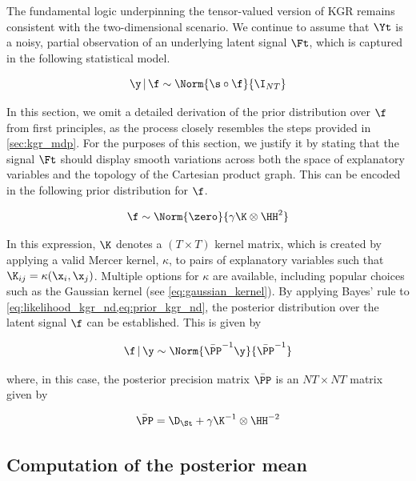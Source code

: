 The fundamental logic underpinning the tensor-valued version of KGR remains consistent with the two-dimensional scenario. We continue to assume that $\Yt$ is a noisy, partial observation of an underlying latent signal $\Ft$, which is captured in the following statistical model.

\begin{equation}
    \label{eq:likelihood_kgr_nd}
    \y \, | \, \f \sim \Norm{\s \circ \f}{\I_{NT}}
\end{equation}

In this section, we omit a detailed derivation of the prior distribution over $\f$ from first principles, as the process closely resembles the steps provided in \cref{sec:kgr_mdp}. For the purposes of this section, we justify it by stating that the signal $\Ft$ should display smooth variations across both the space of explanatory variables and the topology of the Cartesian product graph. This can be encoded in the following prior distribution for $\f$.

\begin{equation}
    \label{eq:prior_kgr_nd}
    \f \sim \Norm{\zero}{\gamma \K \otimes \HH^2}
\end{equation}

In this expression, $\K$ denotes a $(T \times T)$ kernel matrix, which is created by applying a valid Mercer kernel, $\kappa$, to pairs of explanatory variables such that $\K_{ij} = \kappa(\x_i, \x_j)$. Multiple options for $\kappa$ are available, including popular choices such as the Gaussian kernel (see \cref{eq:gaussian_kernel}). By applying Bayes' rule to \cref{eq:likelihood_kgr_nd,eq:prior_kgr_nd}, the posterior distribution over the latent signal $\f$ can be established. This is given by 

\begin{equation}
    \label{eq:posterior_kgr_nd}
    \f \, | \, \y \sim \Norm{\bar{\PP}^{-1} \y}{\bar{\PP}^{-1}}
\end{equation}

where, in this case, the posterior precision matrix $\bar{\PP}$ is an $NT \times NT$ matrix given by


\begin{equation}
    \bar{\PP} = \D_\St + \gamma \K^{-1} \otimes \HH^{-2}
\end{equation}

\subsection{Computation of the posterior mean}

